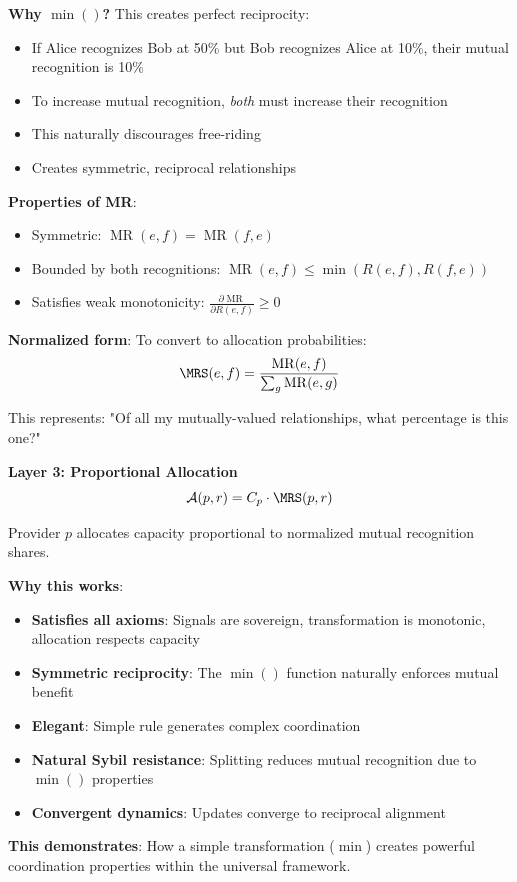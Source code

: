 \documentclass[11pt,a4paper]{article}
\theoremstyle{definition}
\theoremstyle{remark}
\newcommand{\A}{\mathcal{A}}
\DeclareMathOperator{\MR}{MR}
\begin{document}
\textbf{Why $\min()$?} This creates perfect reciprocity:
\begin{itemize}
\item If Alice recognizes Bob at 50\% but Bob recognizes Alice at 10\%, their mutual recognition is 10\%
\item To increase mutual recognition, \textit{both} must increase their recognition
\item This naturally discourages free-riding
\item Creates symmetric, reciprocal relationships
\end{itemize}

\textbf{Properties of MR}:
\begin{itemize}
\item Symmetric: $\MR(e,f) = \MR(f,e)$
\item Bounded by both recognitions: $\MR(e,f) \le \min(R(e,f), R(f,e))$
\item Satisfies weak monotonicity: $\frac{\partial \MR}{\partial R(e,f)} \ge 0$
\end{itemize}

\textbf{Normalized form}: To convert to allocation probabilities:
\[ \MRS(e,f) = \frac{\MR(e,f)}{\sum_g \MR(e,g)} \]

This represents: "Of all my mutually-valued relationships, what percentage is this one?"

\textbf{Layer 3: Proportional Allocation}
\[ \A(p,r) = C_p \cdot \MRS(p,r) \]

Provider $p$ allocates capacity proportional to normalized mutual recognition shares.

\textbf{Why this works}:
\begin{itemize}
\item \textbf{Satisfies all axioms}: Signals are sovereign, transformation is monotonic, allocation respects capacity
\item \textbf{Symmetric reciprocity}: The $\min()$ function naturally enforces mutual benefit
\item \textbf{Elegant}: Simple rule generates complex coordination
\item \textbf{Natural Sybil resistance}: Splitting reduces mutual recognition due to $\min()$ properties
\item \textbf{Convergent dynamics}: Updates converge to reciprocal alignment
\end{itemize}

\textbf{This demonstrates}: How a simple transformation ($\min$) creates powerful coordination properties within the universal framework.
\end{document}
